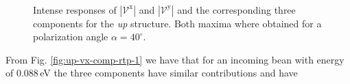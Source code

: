 \documentclass[prb,11pt,tightenlines,twocolumn,aps]{revtex4-1}
\begin{document}
\begin{figure}[t]
    \centering
    \\
    \caption{Intense responses of $|\mathcal{V}^{\mathrm{x}}|$ and
    $|\mathcal{V}^{\mathrm{y}}|$ and the corresponding three components for the
    \emph{up} structure. Both maxima where obtained for a polarization
    angle $\alpha=40^{\circ}$. }
    \label{fig:up-vab-comp-rtp-2}
\end{figure}
From Fig. \ref{fig:up-vx-comp-rtp-1} we have that for an incoming bean with
energy of 0.088\,eV the three components have similar contributions and have
\end{document}
